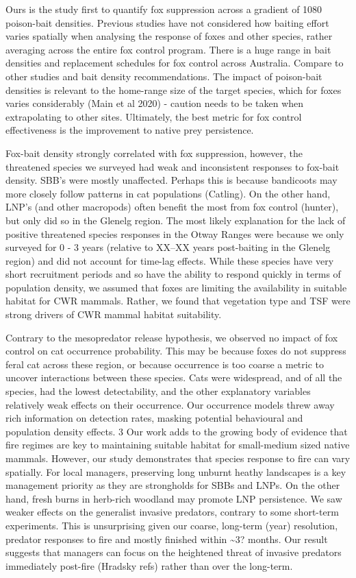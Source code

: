 \documentclass[11pt,a4paper,titlepage,twoside,openright]{style/unimelbthesis}
\begin{document}
\begin{mainmatter}
Ours is the study first to quantify fox suppression across a gradient of 1080 poison-bait densities. Previous studies have not considered how baiting effort varies spatially when analysing the response of foxes and other species, rather averaging across the entire fox control program. There is a huge range in bait densities and replacement schedules for fox control across Australia. Compare to other studies and bait density recommendations.
The impact of poison-bait densities is relevant to the home-range size of the target species, which for foxes varies considerably (Main et al 2020) - caution needs to be taken when extrapolating to other sites. Ultimately, the best metric for fox control effectiveness is the improvement to native prey persistence.

Fox-bait density strongly correlated with fox suppression, however, the threatened species we surveyed had weak and inconsistent responses to fox-bait density. SBB's were mostly unaffected. Perhaps this is because bandicoots may more closely follow patterns in cat populations (Catling). On the other hand, LNP's (and other macropods) often benefit the most from fox control (hunter), but only did so in the Glenelg region. The most likely explanation for the lack of positive threatened species responses in the Otway Ranges were because we only surveyed for 0 - 3 years (relative to XX--XX years post-baiting in the Glenelg region) and did not account for time-lag effects. While these species have very short recruitment periods and so have the ability to respond quickly in terms of population density, we assumed that foxes are limiting the availability in suitable habitat for CWR mammals. Rather, we found that vegetation type and TSF were strong drivers of CWR mammal habitat suitability.

Contrary to the mesopredator release hypothesis, we observed no impact of fox control on cat occurrence probability. This may be because foxes do not suppress feral cat across these region, or because occurrence is too coarse a metric to uncover interactions between these species. Cats were widespread, and of all the species, had the lowest detectability, and the other explanatory variables relatively weak effects on their occurrence. Our occurrence models threw away rich information on detection rates, masking potential behavioural and population density effects.
3
Our work adds to the growing body of evidence that fire regimes are key to maintaining suitable habitat for small-medium sized native mammals. However, our study demonstrates that species response to fire can vary spatially. For local managers, preserving long unburnt heathy landscapes is a key management priority as they are strongholds for SBBs and LNPs. On the other hand, fresh burns in herb-rich woodland may promote LNP persistence. We saw weaker effects on the generalist invasive predators, contrary to some short-term experiments. This is unsurprising given our coarse, long-term (year) resolution, predator responses to fire and mostly finished within \textasciitilde3? months. Our result suggests that managers can focus on the heightened threat of invasive predators immediately post-fire (Hradsky refs) rather than over the long-term.


\end{mainmatter}
\end{document}
